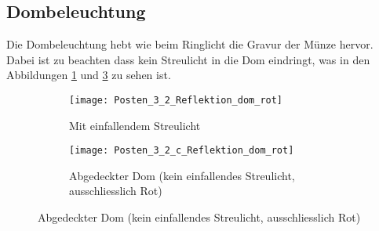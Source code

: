 \subsection{Dombeleuchtung}

Die  Dombeleuchtung  hebt  wie beim Ringlicht die Gravur der  M\"unze  hervor.
Dabei ist zu beachten dass kein Streulicht in  die  Dom  eindringt, was in den
Abbildungen \ref{fig:dom1} und \ref{fig:dom2} zu sehen ist.

\begin{figure}[h!]
    \centering
    \begin{subfigure}[t]{.45\linewidth}
        \texttt{[image: Posten\_3\_2\_Reflektion\_dom\_rot]}
        \caption{Mit einfallendem Streulicht}
        \label{fig:dom1}
    \end{subfigure}
    \begin{subfigure}[t]{.45\linewidth}
        \texttt{[image: Posten\_3\_2\_c\_Reflektion\_dom\_rot]}
        \caption{Abgedeckter Dom (kein einfallendes Streulicht, ausschliesslich Rot)}
        \label{fig:dom2}
    \end{subfigure}
\end{figure}


